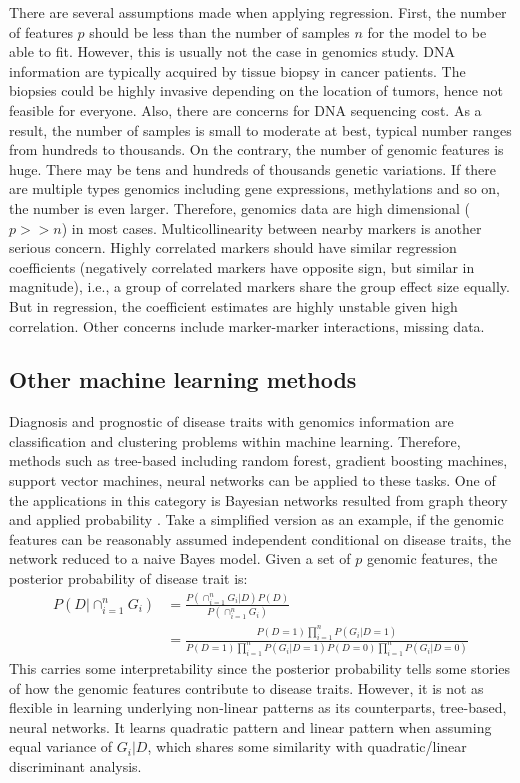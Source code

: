 There are several assumptions made when applying regression. First, the number of features $p$ should be less than the number of samples $n$ for the model to be able to fit. However, this is usually not the case in genomics study. DNA information are typically acquired by tissue biopsy in cancer patients. The biopsies could be highly invasive depending on the location of tumors, hence not feasible for everyone. Also, there are concerns for DNA sequencing cost. As a result, the number of samples is small to moderate at best, typical number ranges from hundreds to thousands. On the contrary, the number of genomic features is huge. There may be tens and hundreds of thousands genetic variations. If there are multiple types genomics including gene expressions, methylations and so on, the number is even larger. Therefore, genomics data are high dimensional ($p>>n$) in most cases. Multicollinearity between nearby markers is another serious concern. Highly correlated markers should have similar regression coefficients (negatively correlated markers have opposite sign, but similar in magnitude), i.e., a group of correlated markers share the group effect size equally. But in regression, the coefficient estimates are highly unstable given high correlation. Other concerns include marker-marker interactions, missing data. 

\subsection{Other machine learning methods}
Diagnosis and prognostic of disease traits with genomics information are classification and clustering problems within machine learning. Therefore, methods such as tree-based including random forest, gradient boosting machines, support vector machines, neural networks can be applied to these tasks. One of the applications in this category is Bayesian networks resulted from graph theory and applied probability \citep{jordan2004graphical}. Take a simplified version as an example, if the genomic features can be reasonably assumed independent conditional on disease traits, the network reduced to a naive Bayes model. Given a set of $p$ genomic features, the posterior probability of disease trait is:
\begin{align*}
    P(D|\cap_{i=1}^n G_i)&=\frac{P(\cap_{i=1}^n G_i|D)P(D)}{P(\cap_{i=1}^n G_i)} \\
    &=\frac{P(D=1)\prod_{i=1}^n P(G_i|D=1)}{P(D=1)\prod_{i=1}^n P(G_i|D=1)P(D=0)\prod_{i=1}^n P(G_i|D=0)}
\end{align*}
This carries some interpretability since the posterior probability tells some stories of how the genomic features contribute to disease traits. However, it is not as flexible in learning underlying non-linear patterns as its counterparts, tree-based, neural networks. It learns quadratic pattern and linear pattern when assuming equal variance of $G_i|D$, which shares some similarity with quadratic/linear discriminant analysis.

